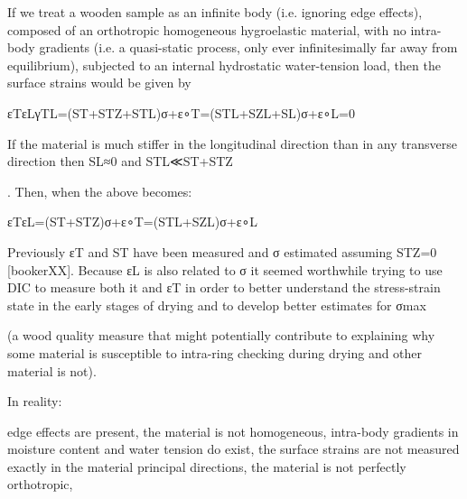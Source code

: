 If we treat a wooden sample as an infinite body (i.e. ignoring edge effects), composed of an orthotropic homogeneous hygroelastic material, with no intra-body gradients (i.e. a quasi-static process, only ever infinitesimally far away from equilibrium), subjected to an internal hydrostatic water-tension load, then the surface strains would be given by

εTεLγTL=(ST+STZ+STL)σ+ε∘T=(STL+SZL+SL)σ+ε∘L=0

If the material is much stiffer in the longitudinal direction than in any transverse direction then SL≈0
and STL≪ST+STZ

. Then, when the above becomes:

εTεL=(ST+STZ)σ+ε∘T=(STL+SZL)σ+ε∘L

Previously εT
and ST have been measured and σ estimated assuming STZ=0 [bookerXX]. Because εL is also related to σ it seemed worthwhile trying to use DIC to measure both it and εT in order to better understand the stress-strain state in the early stages of drying and to develop better estimates for σmax

(a wood quality measure that might potentially contribute to explaining why some material is susceptible to intra-ring checking during drying and other material is not).

In reality:

    edge effects are present,
    the material is not homogeneous,
    intra-body gradients in moisture content and water tension do exist,
    the surface strains are not measured exactly in the material principal directions,
    the material is not perfectly orthotropic,